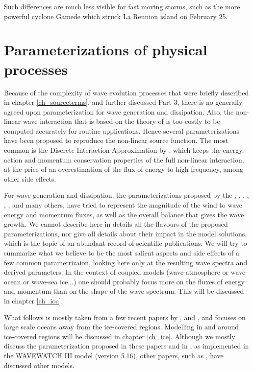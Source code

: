 Such differences are much less visible for fast moving storms, such as the more powerful cyclone Gamede which struck La Reunion island 
on February 25. 


\section{Parameterizations of physical processes}
Because of the complexity of wave evolution processes that were briefly described in chapter \ref{ch_sourceterms}, and further discussed Part 3, there is no generally agreed upon parameterization for wave generation and dissipation. Also, the non-linear 
wave interaction that is based on the theory of \cite{Hasselmann1962} is too costly to be computed accurately for routine applications. Hence several 
parameterizations have been proposed to reproduce the non-linear source function. The most common is the Discrete Interaction 
Approximation by \cite{Hasselmann&al.1985b}, which keeps the energy, action and momentum conservation properties of the full non-linear interaction, 
at the price of an overestimation of the flux of energy to high frequency, among other side effects. 

For wave generation and dissipation, the parameterizations proposed by the \cite{WAMDI1988}, \cite{WAMBook}, \cite{Tolman&Chalikov1996}, 
\cite{Banner&Morison2006},  \cite{Ardhuin&al.2010}, 
\cite{Rogers&al.2012}, and many others, have tried to represent the magnitude of the wind to wave energy and momentum fluxes, as well 
as the overall balance that gives the wave growth. We cannot describe here in details all the flavours of the proposed parameterizations, nor 
give all details about their impact in the model solutions, which is the topic of an abundant record of scientific publications. We will try to 
summarize what we believe to be the most salient aspects and side effects of a few common parametrizaion, looking here only at the resulting 
wave spectra and derived parameters. In the context of coupled models (wave-atmosphere or wave-ocean or wave-sea ice...) one should probably focus more 
on the fluxes of energy and momentum than on the shape of the wave spectrum. This will be discussed in chapter \ref{ch_ioa}. 


What follows is mostly taken from a few recent papers by \cite{Rascle&Ardhuin2013}, \cite{Roland&Ardhuin2014} and \cite{Stopa&al.2016c}, and
focuses on large 
scale oceans away from the ice-covered regions. Modelling in and around ice-covered regions will be discussed in chapter \ref{ch_ice}. Although we mostly discuss the parameterization proposed in these papers and 
in \cite{Zieger&al.2015}, as implemented in the WAVEWATCH III model (version 5.16), other papers, such as \cite{vanVledder&al.2016}, have discussed other models. 



